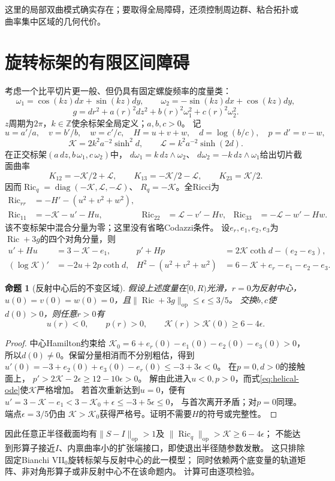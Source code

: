 \documentclass[UTF8,a4paper,11pt,fontset=fandol]{ctexart}
\numberwithin{equation}{section}
\newtheorem{proposition}[theorem]{命题}
\theoremstyle{definition}
\newcommand{\Ric}{\operatorname{Ric}}
\newcommand{\op}{\mathrm{op}}
\newcommand{\Z}{\mathbb Z}
\begin{document}
这里的局部双曲模式确实存在；要取得全局障碍，还须控制周边群、粘合拓扑或
曲率集中区域的几何代价。

\section{旋转标架的有限区间障碍}
考虑一个比平切片更一般、但仍具有固定螺旋频率的度量类：
\[
 \omega_1=\cos(kz)dx+\sin(kz)dy,\qquad
 \omega_2=-\sin(kz)dx+\cos(kz)dy,
\]
\[
 g=dr^2+a(r)^2dz^2+b(r)^2\omega_1^2+c(r)^2\omega_2^2.
\]
$z$周期为$2\pi$，$k\in\Z$使余标架全局定义；$a,b,c>0$。
记
\[
 u=a'/a,\quad v=b'/b,\quad w=c'/c,\quad H=u+v+w,\quad
 d=\log(b/c),\quad p=d'=v-w,
\]
\[
 \mathcal K=2k^2a^{-2}\sinh^2d,\qquad
 \mathcal L=k^2a^{-2}\sinh(2d).
\]
在正交标架$(a\,dz,b\,\omega_1,c\,\omega_2)$中，
$d\omega_1=k\,dz\wedge\omega_2$、
$d\omega_2=-k\,dz\wedge\omega_1$给出切片截面曲率
\[
 K_{12}=-\mathcal K/2+\mathcal L,\qquad
 K_{13}=-\mathcal K/2-\mathcal L,\qquad K_{23}=\mathcal K/2.
\]
因而$\Ric_q=\operatorname{diag}(-\mathcal K,\mathcal L,-\mathcal L)$、
$R_q=-\mathcal K$。全Ricci为
\begin{align*}
 \Ric_{rr}&=-H'-(u^2+v^2+w^2),\\
 \Ric_{11}&=-\mathcal K-u'-Hu,&
 \Ric_{22}&=\mathcal L-v'-Hv,&
 \Ric_{33}&=-\mathcal L-w'-Hw.
\end{align*}
该不变标架中混合分量为零；这里没有省略Codazzi条件。
设$e_r,e_1,e_2,e_3$为$\Ric+3g$的四个对角分量，则
\begin{align}
 u'+Hu&=3-\mathcal K-e_1,&
 p'+Hp&=2\mathcal K\coth d-(e_2-e_3),\label{eq:helical-ode}\\
 (\log\mathcal K)'&=-2u+2p\coth d,&
 H^2-(u^2+v^2+w^2)&=6-\mathcal K+e_r-e_1-e_2-e_3.\nonumber
\end{align}

\begin{proposition}[反射中心后的不变区域]\label{prop:helical}
假设上述度量在$[0,R)$光滑，$r=0$为反射中心，
$u(0)=v(0)=w(0)=0$，且$\|\Ric+3g\|_{\op}\le\epsilon\le3/5$。
交换$b,c$使$d(0)>0$，则任意$r>0$有
\[
 u(r)<0,\qquad p(r)>0,\qquad
 \mathcal K(r)>\mathcal K(0)\ge6-4\epsilon.
\]
\end{proposition}
\begin{proof}
中心Hamilton约束给
$\mathcal K_0=6+e_r(0)-e_1(0)-e_2(0)-e_3(0)>0$，
所以$d(0)\ne0$。保留分量相消而不分别粗估，得到
$u'(0)=-3+e_2(0)+e_3(0)-e_r(0)\le-3+3\epsilon<0$。
在$p=0,d>0$的接触面上，
$p'>2\mathcal K-2\epsilon\ge12-10\epsilon>0$。
解由此进入$u<0,p>0$，而式\eqref{eq:helical-ode}使$\mathcal K$严格增加。
若首次重新达到$u=0$，便有
$u'=3-\mathcal K-e_1<3-\mathcal K_0+\epsilon\le-3+5\epsilon\le0$，
与首次离开矛盾；对$p=0$同理。端点$\epsilon=3/5$仍由
$\mathcal K>\mathcal K_0$获得严格号。证明不需要$H$的符号或完整性。
\end{proof}
因此任意正半径截面均有$\|S-I\|_{\op}>1$及
$\|\Ric_q\|_{\op}>\mathcal K\ge6-4\epsilon$；
不能达到形算子接近$I$、内禀曲率小的扩张端接口，即使退出半径随参数发散。
这只排除固定Bianchi VII$_0$旋转标架与反射中心的此一模型；
同时依赖两个底变量的轨道矩阵、非对角形算子或非反射中心不在该命题内。
计算可由逐项检验。
\end{document}
